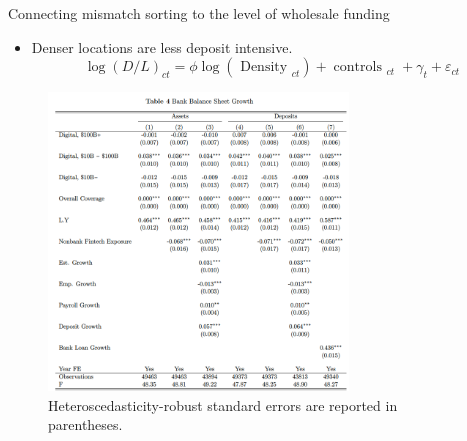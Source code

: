 \documentclass[notes,10pt, aspectratio=169]{beamer}
\begin{document}
        \begin{frame}{Connecting mismatch sorting to the level of wholesale funding         \hyperlink{mismatch_sorting}{}}\label{mismatch_sorting1}

    
            \vspace{0.1cm}
            \begin{itemize}
                \item Denser locations are less deposit intensive.
    $$
    \log (D / L)_{c t}=\phi \log \left(\text { Density }_{c t}\right)+\operatorname{controls~}_{c t}+\gamma_t+\varepsilon_{c t}
    $$
    \end{itemize}
            \begin{figure}
                \centering
                \includegraphics[width=0.71\textwidth]{imgs/tab4.png}
                \caption*{Heteroscedasticity-robust standard errors are reported in parentheses.}
                \label{fig:my_label}
            \end{figure}
            
            \end{frame}
    
\end{document}
